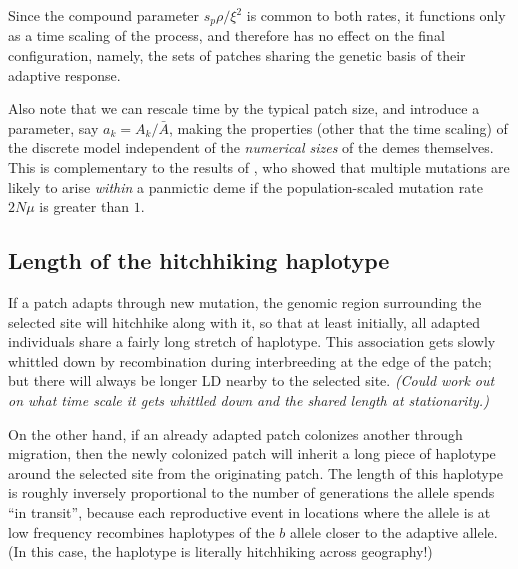 \documentclass{article}
\newcommand{\plr}[1]{{\it\color{blue}(#1)}}
\begin{document}
Since the compound parameter $s_p \rho / \xi^2$ is common to both rates,
it functions only as a time scaling of the process, 
and therefore has no effect on the final configuration, namely, 
the sets of patches sharing the genetic basis of their adaptive response.

Also note that we can rescale time by the typical patch size, and introduce a parameter, say $a_k = A_k/\bar A$,
making the properties (other that the time scaling) of the discrete model independent of the \emph{numerical sizes} of the demes themselves.
This is complementary to the results of \cite{softsweepsII}, who showed that multiple mutations are likely to arise \emph{within} a panmictic deme
if the population-scaled mutation rate $2 N \mu$ is greater than $1$.



\subsection{Length of the hitchhiking haplotype}
\label{ss:haplotype_length}

If a patch adapts through new mutation, the genomic region surrounding the selected site will hitchhike \citep{maynardsmith1974hitchhiking,kaplan1989hitchhiking} along with it,
so that at least initially, all adapted individuals share a fairly long stretch of haplotype.
This association gets slowly whittled down by recombination during interbreeding at the edge of the patch;
but there will always be longer LD nearby to the selected site.
\plr{Could work out on what time scale it gets whittled down and the shared length at stationarity.}

On the other hand, if an already adapted patch colonizes another through migration,
then the newly colonized patch will inherit a long piece of haplotype around the selected site from the originating patch.
The length of this haplotype is roughly inversely proportional to the number of generations the allele spends ``in transit'',
because each reproductive event in locations where the allele is at low frequency
recombines haplotypes of the $b$ allele closer to the adaptive allele.
(In this case, the haplotype is literally hitchhiking across geography!)
\end{document}
